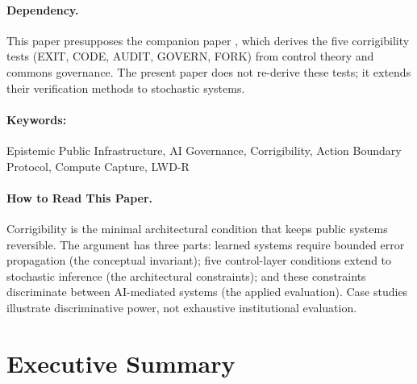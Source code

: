 \documentclass[11pt,a4paper]{article}
\title{\papertitle}
\author{
  Anivar A Aravind~\orcidlink{0009-0009-8995-0005} \\
  Independent Researcher\\
  Bengaluru, India \\
  \texttt{ping@anivar.net}
}
\date{February 2026 (Working Draft)}
\theoremstyle{definition}
\newenvironment{keywords}{\paragraph{Keywords:}}{}
\begin{document}
\maketitle

\begin{abstract}
This paper extends the corrigibility framework to learned and agentic systems, where deterministic rule execution is replaced by probabilistic inference. Three structural pressures constrain corrigibility in learned systems: opacity of inference (requiring LWD-R transparency), concentration of training resources (compute capture), and acceleration of automated action (governance denial of service). The action boundary protocol separates probabilistic inference from deterministic execution. The invariant holds: systems remain corrigible if and only if the five conditions close the loop under stochastic verification.
\end{abstract}

\paragraph{Dependency.} This paper presupposes the companion paper \citep{paper1}, which derives the five corrigibility tests (EXIT, CODE, AUDIT, GOVERN, FORK) from control theory and commons governance. The present paper does not re-derive these tests; it extends their verification methods to stochastic systems.

\begin{keywords}
Epistemic Public Infrastructure, AI Governance, Corrigibility, Action Boundary Protocol, Compute Capture, LWD-R
\end{keywords}

\paragraph{How to Read This Paper.}
Corrigibility is the minimal architectural condition that keeps public systems reversible. The argument has three parts: learned systems require bounded error propagation (the conceptual invariant); five control-layer conditions extend to stochastic inference (the architectural constraints); and these constraints discriminate between AI-mediated systems (the applied evaluation). Case studies illustrate discriminative power, not exhaustive institutional evaluation.

\section*{Executive Summary}
\end{document}
